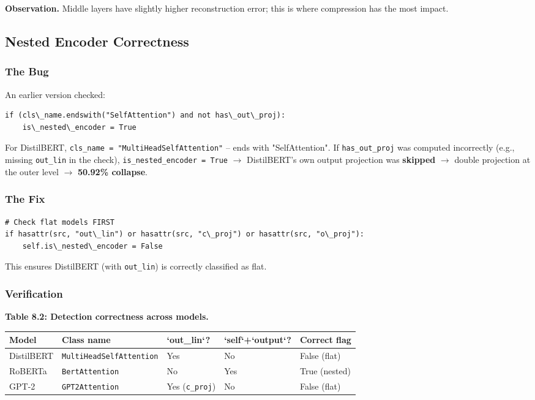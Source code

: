 \textbf{Observation.} Middle layers have slightly higher reconstruction error; 
this is where compression has the most impact.

\subsection{Nested Encoder Correctness}

\subsubsection{The Bug}

An earlier version checked:
\begin{lstlisting}
if (cls\_name.endswith("SelfAttention") and not has\_out\_proj):
    is\_nested\_encoder = True
\end{lstlisting}

For DistilBERT, \texttt{cls\_name = "MultiHeadSelfAttention"} -- ends with 
"SelfAttention". If \texttt{has\_out\_proj} was computed incorrectly (e.g., missing 
\texttt{out\_lin} in the check), \texttt{is\_nested\_encoder = True} $\to$ DistilBERT's own output 
projection was \textbf{skipped} $\to$ double projection at the outer level $\to$ 
\textbf{50.92\% collapse}.

\subsubsection{The Fix}

\begin{lstlisting}
# Check flat models FIRST
if hasattr(src, "out\_lin") or hasattr(src, "c\_proj") or hasattr(src, "o\_proj"):
    self.is\_nested\_encoder = False
\end{lstlisting}

This ensures DistilBERT (with \texttt{out\_lin}) is correctly classified as flat.

\subsubsection{Verification}

\textbf{Table 8.2: Detection correctness across models.}

\begin{table}[H]
\centering
\small
\begin{tabular}{lllll}
\toprule
\textbf{Model} & \textbf{Class name} & \textbf{`out\_lin`?} & \textbf{`self`+`output`?} & \textbf{Correct flag} \\
\midrule
DistilBERT & \texttt{MultiHeadSelfAttention} & Yes & No & False (flat) \\
RoBERTa & \texttt{BertAttention} & No & Yes & True (nested) \\
GPT-2 & \texttt{GPT2Attention} & Yes (\texttt{c\_proj}) & No & False (flat) \\
\bottomrule
\end{tabular}
\end{table}

